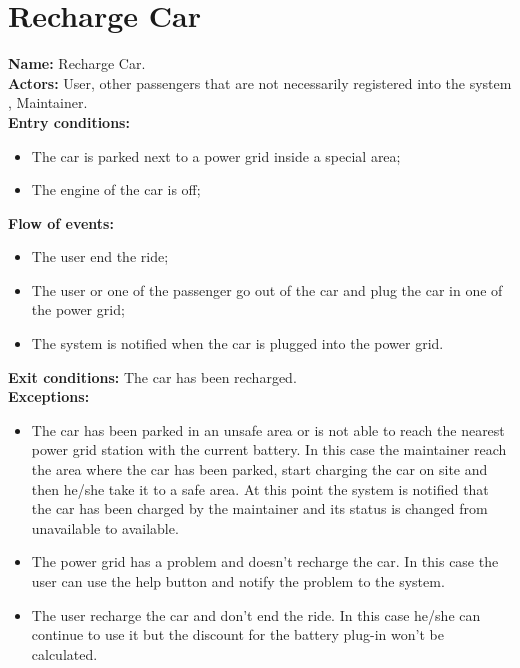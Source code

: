 \section*{Recharge Car}
\textbf{Name:} Recharge Car.\\
\textbf{Actors:} User, other passengers that are not necessarily registered into the system , Maintainer.\\
\textbf{Entry conditions:}
\begin{itemize}
\item The car is parked next to a power grid inside a special area;
\item The engine of the car is off;
\end{itemize}
\textbf{Flow of events:}
\begin{itemize}
\item The user end the ride;
\item The user or one of the passenger go out of the car and plug the car in one of the power grid;
\item The system is notified when the car is plugged into the power grid.
\end{itemize}
\textbf{Exit conditions:} The car has been recharged.\\
\textbf{Exceptions:}
\begin{itemize}
\item The car has been parked in an unsafe area or is not able to reach the nearest power grid station with the current battery. In this case the maintainer reach the area where the car has been parked, start charging the car on site and then he/she take it to a safe area. At this point the system is notified that the car has been charged by the maintainer and its status is changed from unavailable to available.
\item The power grid has  a problem and doesn't recharge the car. In this case the user can use the help button and notify the problem to the system.
\item The user recharge the car and don't end the ride. In this case he/she can continue to use it but the discount for the battery plug-in won't be calculated.
\end{itemize}


